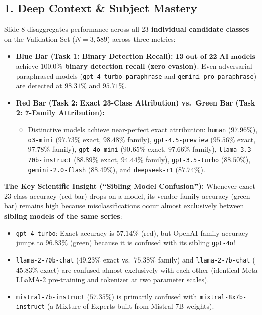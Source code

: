 \documentclass[11pt, a4paper]{article}
\begin{document}
\subsection*{1. Deep Context \& Subject Mastery}
Slide 8 disaggregates performance across all \textbf{$23$ individual candidate classes} on the Validation Set ($N = 3,589$) across three metrics:
\begin{itemize}[noitemsep]
    \item \textbf{Blue Bar (Task 1: Binary Detection Recall):} $\mathbf{13\text{ out of }22\text{ AI models}}$ achieve $\mathbf{100.0\%}$ \textbf{binary detection recall (zero evasion)}. Even adversarial paraphrased models (\texttt{gpt-4-turbo-paraphrase} and \texttt{gemini-pro-paraphrase}) are detected at $\mathbf{98.31\%}$ and $\mathbf{95.71\%}$.
    \item \textbf{Red Bar (Task 2: Exact 23-Class Attribution) vs.\ Green Bar (Task 2: 7-Family Attribution):}
    \begin{itemize}[noitemsep]
        \item Distinctive models achieve near-perfect exact attribution: \texttt{human} ($\mathbf{97.96\%}$), \texttt{o3-mini} ($\mathbf{97.73\%}$ exact, $\mathbf{98.48\%}$ family), \texttt{gpt-4.5-preview} ($\mathbf{95.56\%}$ exact, $\mathbf{97.78\%}$ family), \texttt{gpt-4o-mini} ($\mathbf{90.65\%}$ exact, $\mathbf{97.66\%}$ family), \texttt{llama-3.3-70b-instruct} ($\mathbf{88.89\%}$ exact, $\mathbf{94.44\%}$ family), \texttt{gpt-3.5-turbo} ($\mathbf{88.50\%}$), \texttt{gemini-2.0-flash} ($\mathbf{88.49\%}$), and \texttt{deepseek-r1} ($\mathbf{87.74\%}$).
    \end{itemize}
\end{itemize}

\noindent\textbf{The Key Scientific Insight (``Sibling Model Confusion''):}
Whenever exact $23$-class accuracy (red bar) drops on a model, its vendor family accuracy (green bar) remains high because misclassifications occur almost exclusively between \textbf{sibling models of the same series}:
\begin{itemize}[noitemsep]
    \item \texttt{gpt-4-turbo}: Exact accuracy is $57.14\%$ (red), but OpenAI family accuracy jumps to $\mathbf{96.83\%}$ (green) because it is confused with its sibling \texttt{gpt-4o}!
    \item \texttt{llama-2-70b-chat} ($49.23\%$ exact vs.\ $\mathbf{75.38\%}$ family) and \texttt{llama-2-7b-chat} ($45.83\%$ exact) are confused almost exclusively with each other (identical Meta LLaMA-2 pre-training and tokenizer at two parameter scales).
    \item \texttt{mistral-7b-instruct} ($57.35\%$) is primarily confused with \texttt{mixtral-8x7b-instruct} (a Mixture-of-Experts built from Mistral-7B weights).
\end{itemize}
\end{document}
